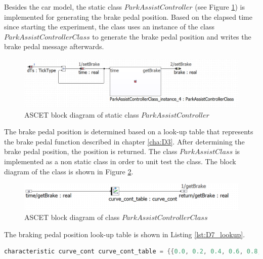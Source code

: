 Besides the car model, the static class $ParkAssistController$ (see Figure \ref{fig:BlockdiagrammParkAssistController}) is implemented for generating the brake pedal position. Based on the elapsed time since starting the experiment, the class uses an instance of the class $ParkAssistControllerClass$ to generate the brake pedal position and writes the brake pedal message afterwards. 

\begin{figure}[H]
\centering
\includegraphics[width=1\textwidth]{images/Blockdiagramm_ParkAssistController.png}
\caption{ASCET block diagram of static class $ParkAssistController$}
\label{fig:BlockdiagrammParkAssistController}
\end{figure}

The brake pedal position is determined based on a look-up table that represents the brake pedal function described in chapter \ref{cha:D3}. After determining the brake pedal position, the position is returned.  The class $ParkAssistClass$ is implemented as a non static class in order to unit test the class. The block diagram of the class is shown in Figure \ref{fig:BlockdiagrammParkAssistControllerClass}. 

\begin{figure}[H]
\centering
\includegraphics[width=1\textwidth]{images/Blockdiagramm_ParkAssistControllerClass.png}
\caption{ASCET block diagram of class $ParkAssistControllerClass$}
\label{fig:BlockdiagrammParkAssistControllerClass}
\end{figure}

The braking pedal position look-up table is shown in Listing \ref{lst:D7_lookup}. 

\begin{lstlisting}[language=Java,basicstyle=\scriptsize, caption= Braking pressure look up table,label= lst:D7_lookup]
characteristic curve_cont curve_cont_table = {{0.0, 0.2, 0.4, 0.6, 0.8, 1.0, 1.2}, {0.0, 0.043, 0.073, 0.078, 0.073, 0.043, 0.0}};
\end{lstlisting}

